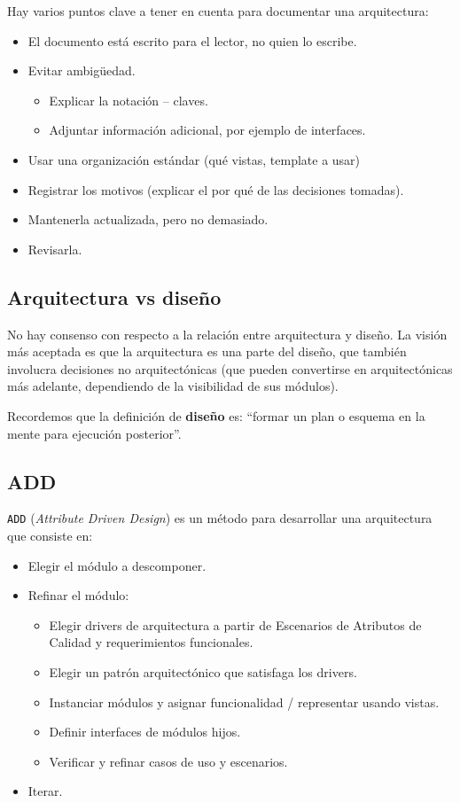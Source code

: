 \documentclass[]{article}
\begin{document}
Hay varios puntos clave a tener en cuenta para documentar una arquitectura:
\begin{itemize}
    \item El documento está escrito para el lector, no quien lo escribe.
    \item Evitar ambigüedad.
    \begin{itemize}
        \item Explicar la notación – claves.
        \item Adjuntar información adicional, por ejemplo de interfaces.
    \end{itemize}
    \item Usar una organización estándar (qué vistas, template a usar)
    \item Registrar los motivos (explicar el por qué de las decisiones tomadas).
    \item Mantenerla actualizada, pero no demasiado.
    \item Revisarla.
\end{itemize}

\subsection{Arquitectura vs diseño}
No hay consenso con respecto a la relación entre arquitectura y diseño. La visión más aceptada es que la arquitectura es una parte del diseño, que también involucra decisiones no arquitectónicas (que pueden convertirse en arquitectónicas más adelante, dependiendo de la visibilidad de sus módulos).

Recordemos que la definición de \textbf{diseño} es: ``formar un plan o esquema en la mente para ejecución posterior''.

\subsection{ADD}
\texttt{ADD} (\emph{Attribute Driven Design}) es un método para desarrollar una arquitectura que consiste en:
\begin{itemize}
    \item Elegir el módulo a descomponer.
    \item Refinar el módulo:
    \begin{itemize}
        \item Elegir drivers de arquitectura a partir de Escenarios de Atributos de Calidad y requerimientos funcionales.
        \item Elegir un patrón arquitectónico que satisfaga los drivers.
        \item Instanciar módulos y asignar funcionalidad / representar usando vistas.
        \item Definir interfaces de módulos hijos.
        \item Verificar y refinar casos de uso y escenarios.
    \end{itemize}
    \item Iterar.
\end{itemize}
\end{document}
